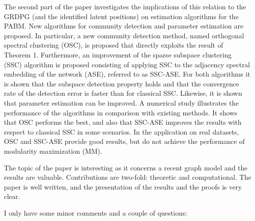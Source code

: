 \documentclass[
]{article}
\begin{document}
The second part of the paper investigates the implications of this
relation to the GRDPG (and the identified latent positions) on
estimation algorithms for the PABM. New algorithms for community
detection and parameter estimation are proposed. In particular, a new
community detection method, named orthogonal spectral clustering (OSC),
is proposed that directly exploits the result of Theorem 1. Furthermore,
an improvement of the sparse subspace clustering (SSC) algorithm is
proposed consisting of applying SSC to the adjacency spectral embedding
of the network (ASE), referred to as SSC-ASE. For both algorithms it is
shown that the subspace detection property holds and that the
convergence rate of the detection error is faster than for classical
SSC. Likewise, it is shown that parameter estimation can be improved. A
numerical study illustrates the performance of the algorithms in
comparison with existing methods. It shows that OSC performs the best,
and also that SSC-ASE improves the results with respect to classical SSC
in some scenarios. In the application on real datasets, OSC and SSC-ASE
provide good results, but do not achieve the performance of modularity
maximization (MM).

The topic of the paper is interesting as it concerns a recent graph
model and the results are valuable. Contributions are two-fold:
theoretic and computational. The paper is well written, and the
presentation of the results and the proofs is very clear.

I only have some minor comments and a couple of questions:
\end{document}
